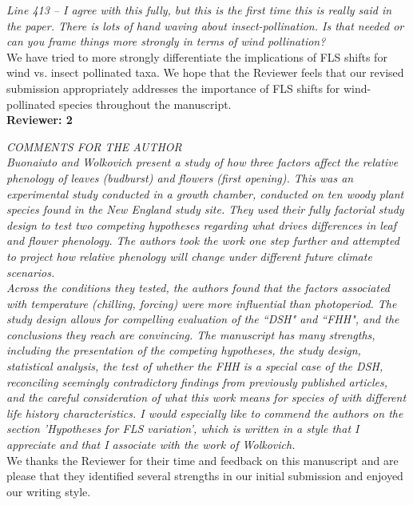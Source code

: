 \documentclass[11pt]{article}
\begin{document}
\emph{Line 413 – I agree with this fully, but this is the first time this is really said in the paper. There is lots of hand waving about insect-pollination. Is that needed or can you frame things more strongly in terms of wind pollination?}\\

We have tried to more strongly differentiate the implications of FLS shifts for wind vs. insect pollinated taxa. We hope that the Reviewer feels that our revised submission appropriately addresses the importance of FLS shifts for wind-pollinated species throughout the manuscript.\\

\textbf{Reviewer: 2}

\emph{COMMENTS FOR THE AUTHOR}\\
\emph{Buonaiuto and Wolkovich present a study of how three factors affect the relative phenology of leaves (budburst) and flowers (first opening).  This was an experimental study conducted in a growth chamber, conducted on ten woody plant species found in the New England study site. They used their fully factorial study design to test two competing hypotheses regarding what drives differences in leaf and flower phenology. The authors took the work one step further and attempted to project how relative phenology will change under different future climate scenarios.}\\

\emph{Across the conditions they tested, the authors found that the factors associated with temperature (chilling, forcing) were more influential than photoperiod. The study design allows for compelling evaluation of the ``DSH" and ``FHH", and the conclusions they reach are convincing. The manuscript has many strengths, including the presentation of the competing hypotheses, the study design, statistical analysis, the test of whether the FHH is a special case of the DSH, reconciling seemingly contradictory findings from previously published articles, and the careful consideration of what this work means for species of with different life history characteristics. I would especially like to commend the authors on the section 'Hypotheses for FLS variation', which is written in a style that I appreciate and that I associate with the work of Wolkovich.}\\

We thanks the Reviewer for their time and feedback on this manuscript and are please that they identified several strengths in our initial submission and enjoyed our writing style.\\
\end{document}
